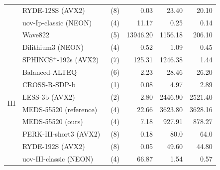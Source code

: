 \documentclass[11pt,a4paper]{report}
\theoremstyle{definition}
\begin{document}
\begin{table}
{\begin{tabular}{p{1.1cm}lrrrr}
                          & RYDE-128S (AVX2)~\cite{aragon2023ryde}             & (8)          & 0.03            & 23.40         & 20.10           \\
                          & uov-Ip-classic (NEON)~\cite{beullens2023uov}       & (4)          & 11.17           & 0.25          & 0.14            \\
                          & Wave822~\cite{banegas2023wave}                     & (5)          & 13946.20        & 1156.18       & 206.10          \\
      \midrule
      \multirow{11}{*}{III}
                          & Dilithium3 (NEON)~\cite{becker2021neon}            & (4)          & 0.52            & 1.09          & 0.45            \\
                          & SPHINCS$^+$-192s (AVX2)~\cite{aumasson2022sphincs} & (7)          & 125.31          & 1246.38       & 1.44            \\
      \addlinespace[0.5em]
                          & Balanced-ALTEQ~\cite{blaser2024alteq}              & (6)          & 2.23            & 28.46         & 26.20           \\
                          & CROSS-R-SDP-b~\cite{baldi2024cross}                & (1)          & 0.08            & 4.97          & 2.89            \\
                          & LESS-3b (AVX2)~\cite{baldi2024less}                & (2)          & 2.80            & 2446.90       & 2521.40         \\
                          & MEDS-55520 (reference)                             & (4)          & 22.66           & 3623.80       & 3628.16         \\
                          & MEDS-55520 (ours)                                  & (4)          & 7.18            & 927.91        & 878.27          \\
                          & PERK-III-short3 (AVX2)~\cite{aaraj2023perk}        & (8)          & 0.18            & 80.0          & 64.0            \\
                          & RYDE-192S (AVX2)~\cite{aragon2023ryde}             & (8)          & 0.05            & 49.60         & 44.80           \\
                          & uov-III-classic (NEON)~\cite{beullens2023uov}      & (4)          & 66.87           & 1.54          & 0.57            \\

\end{tabular}}
\end{table}
\end{document}
